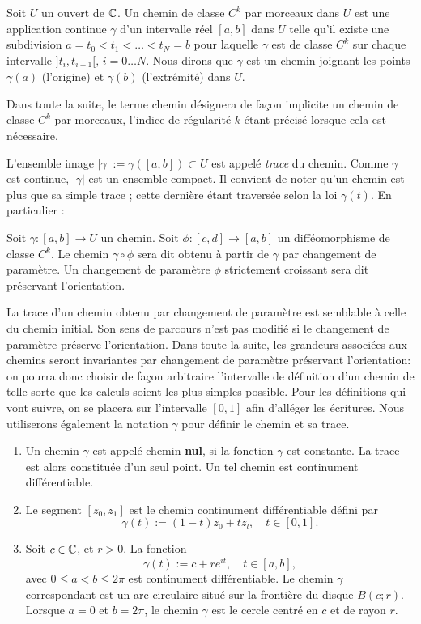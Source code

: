\begin{fdefn}
Soit $U$ un ouvert de $\mathbb{C}$. Un chemin de classe $C^k$ par morceaux dans $U$ est une application continue $\gamma$ d'un intervalle réel $[a,b]$ dans $U$ telle qu'il existe une subdivision $a=t_0 < t_1 < \dots < t_N = b$ pour laquelle $\gamma$ est de classe $C^k$ sur chaque intervalle $]t_i,t_{i+1}[, \, i=0 \dots N$. Nous dirons que $\gamma$ est un chemin joignant les points $\gamma(a)$ (l'origine) et $\gamma(b)$ (l'extrémité) dans $U$.
\end{fdefn}
Dans toute la suite, le terme \og chemin \fg{} désignera de façon implicite un chemin de classe $C^k$ par morceaux, l'indice de régularité $k$ étant précisé lorsque cela est nécessaire. 

L'ensemble image $\lvert\gamma \rvert:=\gamma([a, b])\subset U$ est appelé \emph{trace} du chemin. Comme $\gamma$ est continue, $\lvert\gamma \rvert$ est un ensemble compact. Il convient de noter qu'un chemin est plus que sa simple trace ; cette dernière étant traversée selon la loi $\gamma(t)$. En particulier :

\begin{fdefn}
Soit $\gamma \colon [a,b] \to U$ un chemin. Soit $\phi \colon [c,d] \to [a,b]$ un difféomorphisme de classe $C^k$. Le chemin $\gamma \circ \phi$ sera dit obtenu à partir de $\gamma$ par changement de paramètre. Un changement de paramètre $\phi$ strictement croissant sera dit préservant l'orientation.
\end{fdefn}
La trace d'un chemin obtenu par changement de paramètre est semblable à celle du chemin initial. Son sens de parcours n'est pas modifié si le changement de paramètre préserve l'orientation. Dans toute la suite, les grandeurs associées aux chemins seront invariantes par changement de paramètre préservant l'orientation: on pourra donc choisir de façon arbitraire l'intervalle de définition d'un chemin de telle sorte que les calculs soient les plus simples possible. Pour les définitions qui vont suivre, on se placera sur l'intervalle $[0,1]$ afin d'alléger les écritures. Nous utiliserons également la notation $\gamma$ pour définir le chemin et sa trace.


\begin{exem}
\begin{enumerate}
\item Un chemin $\gamma$ est appelé chemin \textbf{nul}, si la fonction $\gamma$ est constante. La trace est alors constituée d'un seul point. Un tel chemin est continument différentiable.
\item Le segment $[z_0, z_1]$ est le chemin continument différentiable défini par
\[\gamma(t) := (1 - t)z_0 + tz_l, \quad t \in [0,1].\]
\item Soit $c \in \mathbb{C}$, et $r > 0$. La fonction 
\[\gamma(t) := c + r e^{it}, \quad t \in [a,b],\]
avec $0 \leq a < b \leq 2 \pi$ est continument différentiable. Le chemin $\gamma$ correspondant est un arc circulaire situé sur la frontière du disque $B(c;r)$. Lorsque $a=0$ et $b=2 \pi$, le chemin $\gamma$ est le cercle centré en $c$ et de rayon $r$.  
\end{enumerate}
\end{exem}



